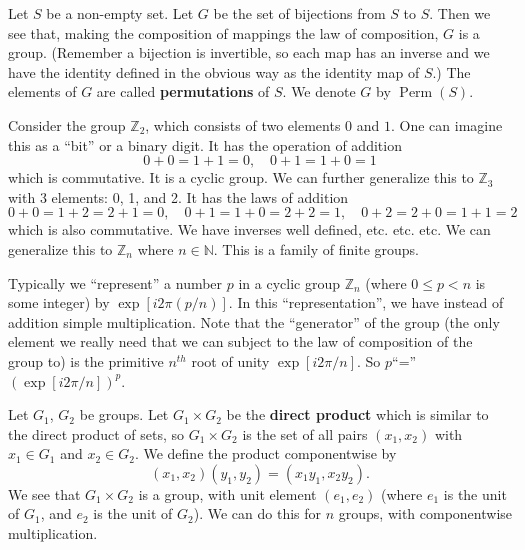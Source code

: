 \begin{ex}
Let $S$ be a non-empty set. Let $G$ be the set of bijections
from $S$ to $S$. Then we see that, making the composition of
mappings the law of composition, $G$ is a group. (Remember a
bijection is invertible, so each map has an inverse and we
have the identity defined in the obvious way as the identity
map of $S$.) The elements of $G$ are called
\textbf{permutations} of $S$. We denote
$G$ by $\operatorname{Perm}(S)$. \qef
\end{ex}
\begin{ex}
Consider the group $\mathbb{Z}_{2}$, which consists of two
elements $0$ and $1$. One can imagine this as a ``bit'' or a
binary digit. It has the operation of addition
\begin{equation}
0+0=1+1=0,\quad 0+1=1+0=1
\end{equation}
which is commutative. It is a cyclic group. We can further
generalize this to $\mathbb{Z}_{3}$ with 3 elements: 0, 1,
and 2. It has the laws of addition
\begin{equation}
0+0=1+2=2+1=0,\quad 0+1=1+0=2+2=1,\quad 0+2=2+0=1+1=2
\end{equation}
which is also commutative. We have inverses well defined,
etc. etc. etc. We can generalize this to $\mathbb{Z}_{n}$
where $n\in\mathbb{N}$. This is a family of finite groups. \qef
\end{ex}
\begin{rmk}
Typically we ``represent'' a number $p$ in a cyclic group
$\mathbb{Z}_{n}$ (where $0\leq p<n$ is some integer) by
$\exp[i2\pi (p/n)]$. In this ``representation'', we have
instead of addition simple multiplication. Note that the
``generator'' of the group (the only element we really need
that we can subject to the law of composition of the group
to) is the primitive $n^{th}$ root of unity
$\exp[i2\pi/n]$. So $p$``=''$(\exp[i2\pi/n])^p$.
\end{rmk}
\begin{ex}
Let $G_1$, $G_2$ be groups. Let $G_1\times G_2$ be the
\textbf{direct product}
which is similar to the direct product of sets, so
$G_1\times G_2$ is the set of all pairs $(x_1, x_2)$ with
$x_1\in G_1$ and $x_2\in G_2$. We define the product
componentwise by
\begin{equation}
(x_1,x_2)(y_1,y_2) = (x_1y_1,x_2y_2).
\end{equation}
We see that $G_1\times G_2$ is a group, with unit element
$(e_1, e_2)$ (where $e_1$ is the unit of $G_1$, and $e_2$ is
the unit of $G_2$). We can do this for $n$ groups, with
componentwise multiplication. \qef
\end{ex}

